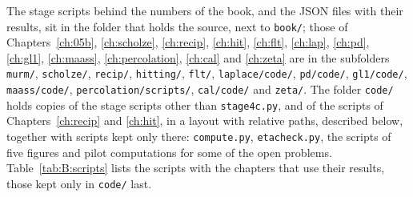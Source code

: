 The stage scripts behind the numbers of the book, and the JSON files with their results, sit in the folder that holds the source, next to \texttt{book/}; those of Chapters~\ref{ch:05b}, \ref{ch:scholze}, \ref{ch:recip}, \ref{ch:hit}, \ref{ch:flt}, \ref{ch:lap}, \ref{ch:pd}, \ref{ch:gl1}, \ref{ch:maass}, \ref{ch:percolation}, \ref{ch:cal} and \ref{ch:zeta} are in the subfolders \texttt{murm/}, \texttt{scholze/}, \texttt{recip/}, \texttt{hitting/}, \texttt{flt/}, \texttt{laplace/code/}, \texttt{pd/code/}, \texttt{gl1/code/}, \texttt{maass/code/}, \texttt{percolation/\allowbreak scripts/}, \texttt{cal/code/} and \texttt{zeta/}. The folder \texttt{code/} holds copies of the stage scripts other than \texttt{stage4c.py}, and of the scripts of Chapters~\ref{ch:recip} and \ref{ch:hit}, in a layout with relative paths, described below, together with scripts kept only there: \texttt{compute.py}, \texttt{etacheck.py}, the scripts of five figures and pilot computations for some of the open problems. Table~\ref{tab:B:scripts} lists the scripts with the chapters that use their results, those kept only in \texttt{code/} last.

